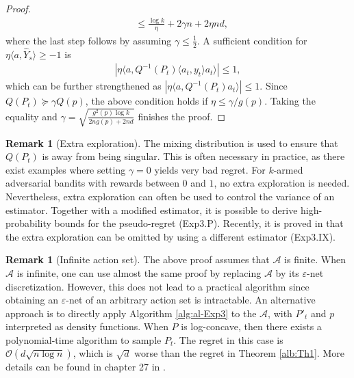 \documentclass[10pt,a4article]{article}
\numberwithin{equation}{section}
\theoremstyle{plain}
\theoremstyle{definition}
\newtheorem{Rem}[Th]{Remark}
\def\e{{\varepsilon}}
\begin{document}
\begin{proof}
\begin{align*}
&\leq \frac{\log k}{\eta}+2\gamma n+2\eta nd,
\end{align*}
where the last step follows by assuming $\gamma\leq\frac{1}{2}$. A sufficient condition for $\eta\langle a, \hat{Y}_s\rangle\geq -1$ is
\begin{align*}
\left|\eta\langle a, Q^{-1}(P_t)\langle a_t, y_t\rangle a_t\rangle\right|\leq 1,
\end{align*}
which can be further strengthened as $\left|\eta\langle a, Q^{-1}(P_t)a_t\rangle\right|\leq 1$. Since $Q(P_t)\succcurlyeq \gamma Q(p)$, the above condition holds if $\eta\leq \gamma/g(p)$. Taking the equality and $\gamma=\sqrt{\frac{g^2(p)\log k}{2ng(p)+2nd}}$ finishes the proof.   
\end{proof}

\begin{Rem}[Extra exploration]
The mixing distribution is used to ensure that $Q(P_t)$ is away from being singular. 
This is often necessary in practice, as there exist examples where setting $\gamma = 0$ yields very bad regret. For $k$-armed adversarial bandits with rewards between $0$ and $1$, no extra exploration is needed. 
Nevertheless, extra exploration can often be used to control the variance of an estimator. 
Together with a modified estimator, it is possible to derive high-probability bounds for the pseudo-regret \cite{Auer_2002} (Exp3.P). 
Recently, it is proved in \cite{kocak2014efficient} that the extra exploration can be omitted by using a different estimator \cite{kocak2014efficient} (Exp3.IX). 
\end{Rem}

\begin{Rem}[Infinite action set]
The above proof assumes that $\mathcal A$ is finite. When $\mathcal A$ is infinite, one can use almost the same proof by replacing $\mathcal A$ by its $\e$-net discretization. However, this does not lead to a practical algorithm since obtaining an $\e$-net of an arbitrary action set is intractable. An alternative approach is to directly apply Algorithm \ref{alg:al-Exp3} to the $\mathcal A$, with $P'_t$ and $p$ interpreted as density functions. When $P$ is log-concave, then there exists a polynomial-time algorithm to sample $P_t$. The regret in this case is $\mathcal O(d\sqrt{n\log n})$, which is $\sqrt{d}$ worse than the regret in Theorem \ref{alb:Th1}. More details can be found in chapter 27 in \cite{lattimore2018bandit}. 
\end{Rem}
\end{document}
